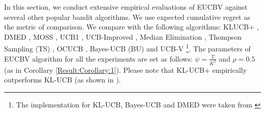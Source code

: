 In this section, we conduct extensive empirical evaluations of EUCBV against several other popular bandit algorithms. We use expected cumulative regret as the metric of comparison. We compare with the following algorithms:  KLUCB+ \cite{garivier2011kl}, DMED \cite{honda2010asymptotically}, MOSS \cite{audibert2009minimax}, UCB1 \cite{auer2002finite}, UCB-Improved \cite{auer2010ucb}, Median Elimination \cite{even2006action}, Thompson Sampling (TS) \cite{agrawal2011analysis}, OCUCB \cite{lattimore2015optimally}, Bayes-UCB (BU) \cite{kaufmann2012bayesian} and UCB-V \cite{audibert2009exploration}\footnote{The implementation for KL-UCB, Bayes-UCB and DMED were taken from \cite{CapGarKau12}}. The parameters of EUCBV algorithm for all the experiments are set as follows: $\psi=\frac{T}{K^2}$ and $\rho =0.5$ (as in Corollary \ref{Result:Corollary:1}). Please note that KL-UCB+ empirically outperforms KL-UCB (as shown in \cite{garivier2011kl}).


